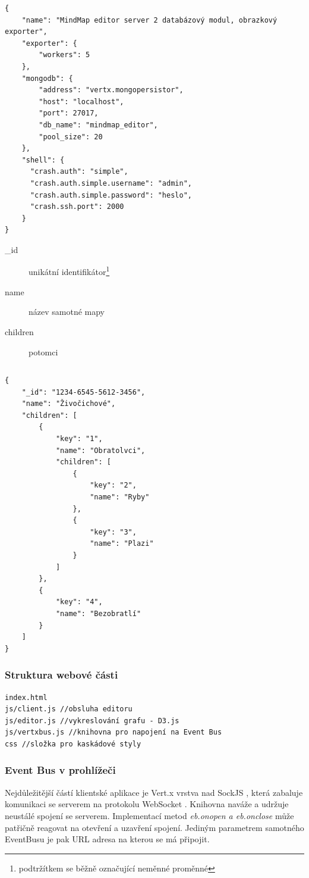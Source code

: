 \begin{lstlisting}[caption={Konfigurace serveru 2},label=confServ2]
{
    "name": "MindMap editor server 2 databázový modul, obrazkový exporter",
    "exporter": {
        "workers": 5
    },
    "mongodb": {
        "address": "vertx.mongopersistor",
        "host": "localhost",
        "port": 27017,
        "db_name": "mindmap_editor",
        "pool_size": 20
    },
    "shell": {
      "crash.auth": "simple",
      "crash.auth.simple.username": "admin",
      "crash.auth.simple.password": "heslo",
      "crash.ssh.port": 2000
    }
}
\end{lstlisting}

\begin{description}
\item[\_id] unikátní identifikátor\footnote{podtržítkem se běžně označující neměnné proměnné}
\item[name] název samotné mapy
\item[children] potomci
\end{description}

\begin{lstlisting}
\end{lstlisting}

\begin{lstlisting}
{
	"_id": "1234-6545-5612-3456",
	"name": "Živočichové",
	"children": [
		{
			"key": "1",
			"name": "Obratolvci",
			"children": [
				{
					"key": "2",
					"name": "Ryby"
				},
				{
					"key": "3",
					"name": "Plazi"
				}
			]
		},
		{
			"key": "4",
			"name": "Bezobratlí"
		}
	]
}
\end{lstlisting}

\subsubsection{Struktura webové části}

\begin{lstlisting}
index.html
js/client.js //obsluha editoru
js/editor.js //vykreslování grafu - D3.js
js/vertxbus.js //knihovna pro napojení na Event Bus
css //složka pro kaskádové styly
\end{lstlisting}


\subsubsection{Event Bus v prohlížeči}

Nejdůležitější částí klientské aplikace je Vert.x vrstva nad SockJS \cite{sockjs}, která zabaluje komunikaci se serverem na protokolu WebSocket \cite{webSockets}. Knihovna naváže a udržuje neustálé spojení se serverem. Implementací metod \emph{eb.onopen a eb.onclose} může patřičně reagovat na otevření a uzavření spojení. Jediným parametrem samotného EventBusu je pak URL adresa na kterou se má připojit.

